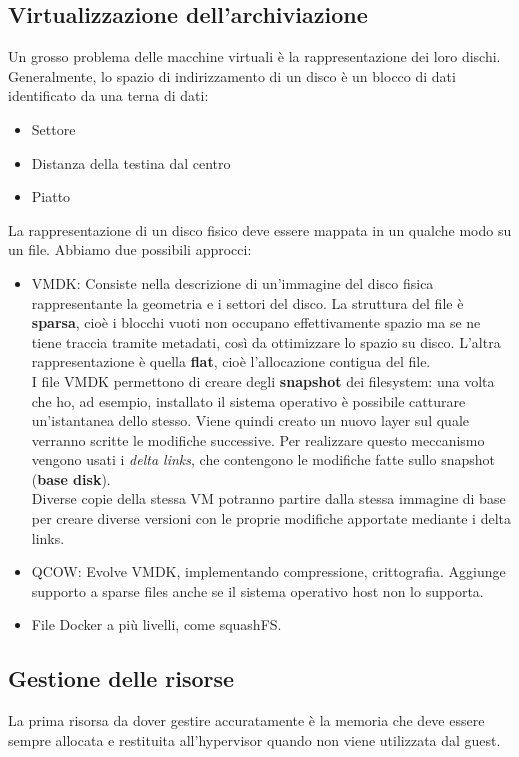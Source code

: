 \documentclass{article}
\begin{document}
		\subsection{Virtualizzazione dell'archiviazione}
		Un grosso problema delle macchine virtuali è la rappresentazione dei loro dischi.
		Generalmente, lo spazio di indirizzamento di un disco è un blocco di dati identificato
		da una terna di dati: 
		\begin{itemize}
			\item Settore
			\item Distanza della testina dal centro
			\item Piatto
		\end{itemize}
		La rappresentazione di un disco fisico deve essere mappata in un qualche modo su un file. Abbiamo due possibili approcci:
		\begin{itemize}
		    \item VMDK: Consiste nella descrizione di un'immagine del disco fisica rappresentante la geometria e i settori del disco. La struttura del file è \textbf{sparsa}, cioè i blocchi vuoti non occupano effettivamente spazio ma se ne tiene traccia tramite metadati, così da ottimizzare lo spazio su disco. L'altra rappresentazione è quella \textbf{flat}, cioè l'allocazione contigua del file.\\ 
		    
		    I file VMDK permettono di creare degli \textbf{snapshot} dei filesystem: una volta che ho, ad
		    esempio, installato il sistema operativo è possibile catturare un'istantanea dello stesso.
		    Viene quindi creato un nuovo layer sul quale verranno scritte le modifiche successive. Per realizzare questo meccanismo vengono usati i
		    \textit{delta links}, che contengono le modifiche fatte sullo snapshot (\textbf{base disk}).\\
		    Diverse copie della stessa VM potranno partire dalla stessa immagine di base per creare diverse versioni con le proprie modifiche apportate mediante i delta links.
		    \item QCOW: Evolve VMDK, implementando compressione, crittografia. Aggiunge supporto a sparse files anche se il sistema operativo host non lo supporta.
		    \item File Docker a più livelli, come squashFS.
		\end{itemize}
		
		\subsection{Gestione delle risorse}
		La prima risorsa da dover gestire accuratamente è la memoria che deve essere sempre allocata e restituita all'hypervisor quando non viene utilizzata dal guest.\\
		
\end{document}
